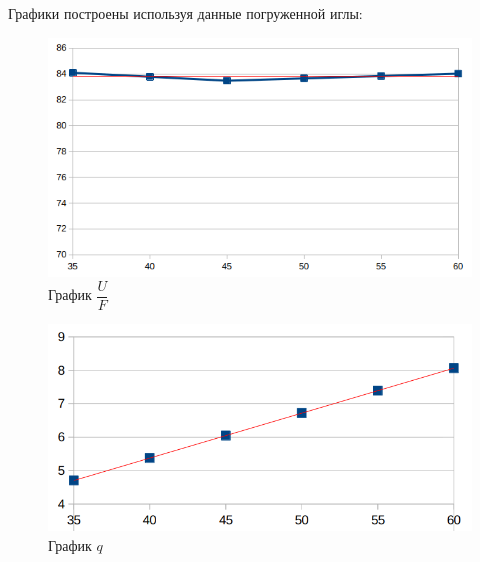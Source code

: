 \documentclass[a4paper,12pt]{article}
\theoremstyle{definition}
\begin{document}
	Графики построены используя данные погруженной иглы:
	\begin{table}[H]
		\centering
		\begin{minipage}{.49\linewidth}
			\centering
			\begin{figure}[H]
				\centering
				\includegraphics[scale = 0.25]{chart3.png}
				\caption{График $\dfrac{U}{F}$}
				\label{graph4}
			\end{figure}
		\end{minipage}
		\begin{minipage}{.49\linewidth}
			\centering
			\begin{figure}[H]
				\centering
				\includegraphics[scale = 0.25]{Screenshot from 2023-02-19 18-18-50.png}
				\caption{График $q$}
				\label{graph5}
			\end{figure}
		\end{minipage}
	\end{table}
\end{document}
